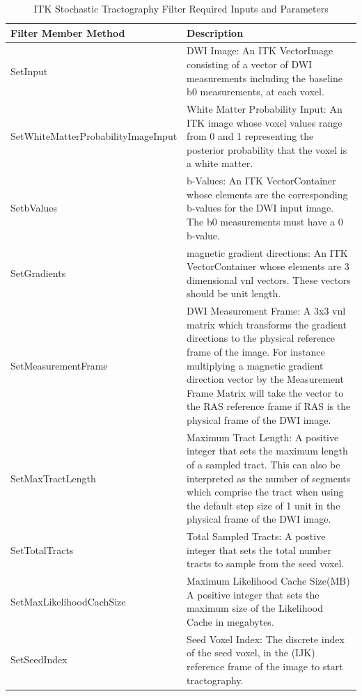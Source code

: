 \begin{table} \label{tab:filterinputs}
  \center
  \begin{tabular}{| l | p{8cm} |}
    \hline 
    Filter Member Method & Description\\
    \hline
    \small{SetInput} & DWI Image: An ITK VectorImage consisting of a vector of DWI measurements including the baseline b0 measurements, at each voxel. \\
    \hline
    \small{SetWhiteMatterProbabilityImageInput} & White Matter Probability Input: An ITK image whose voxel values range from 0 and 1 representing the posterior probability that the voxel is a white matter.  \\
    \hline
    \small{SetbValues} &  b-Values: An ITK VectorContainer whose elements are the corresponding b-values for the DWI input image.  The b0 measurements must have a 0 b-value. \\
    \hline
    \small{SetGradients} & magnetic gradient directions: An ITK VectorContainer whose elements are 3 dimensional vnl vectors.  These vectors should be unit length.\\
    \hline
    \small{SetMeasurementFrame} & DWI Measurement Frame: A 3x3 vnl matrix which transforms the gradient directions to the physical reference frame of the image.  For instance multiplying a magnetic gradient direction vector by the Measurement Frame Matrix will take the vector to the RAS reference frame if RAS is the physical frame of the DWI image. \\
    \hline
    \small{SetMaxTractLength} & Maximum Tract Length: A positive integer that sets the maximum length of a sampled tract.  This can also be interpreted as the number of segments which comprise the tract when using the default step size of 1 unit in the physical frame of the DWI image. \\
    \hline
    \small{SetTotalTracts} & Total Sampled Tracts: A postive integer that sets the total number tracts to sample from the seed voxel. \\
    \hline
    \small{SetMaxLikelihoodCachSize} & Maximum Likelihood Cache Size(MB) A positive integer that sets the maximum size of the Likelihood Cache in megabytes.\\
    \hline
    \small{SetSeedIndex} & Seed Voxel Index:  The discrete index of the seed voxel, in the (IJK) reference frame of the image to start tractography.\\
    \hline
  \end{tabular}
  \caption{ITK Stochastic Tractography Filter Required Inputs and Parameters}
\end{table}

